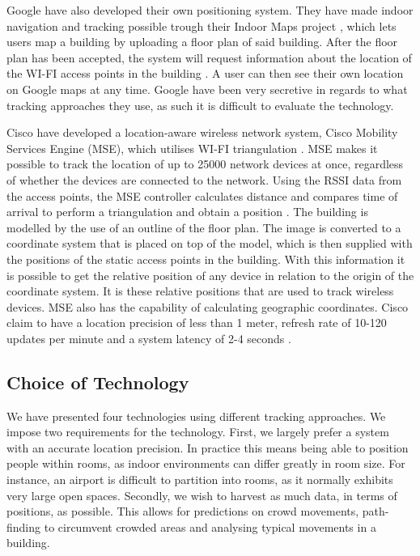 Google have also developed their own positioning system. They have made indoor navigation and tracking possible trough their Indoor Maps project \cite{IPSoverGPS}, which lets users map a building by uploading a floor plan of said building. After the floor plan has been accepted, the system will request information about the location of the WI-FI access points in the building \cite{googleindoormaps}. A user can then see their own location on Google maps at any time. Google have been very secretive in regards to what tracking approaches they use, as such it is difficult to evaluate the technology.

Cisco have developed a location-aware wireless network system, Cisco Mobility Services Engine (MSE), which utilises WI-FI triangulation \cite{CiscoTri}. MSE makes it possible to track the location of up to 25000 network devices at once, regardless of whether the devices are connected to the network. Using the RSSI data from the access points, the MSE controller calculates distance and compares time of arrival to perform a triangulation and obtain a position \cite{ciscoMSE}.
The building is modelled by the use of an outline of the floor plan. The image is converted to a coordinate system that is placed on top of the model, which is then supplied with the positions of the static access points in the building. With this information it is possible to get the relative position of any device in relation to the origin of the coordinate system. It is these relative positions that are used to track wireless devices. MSE also has the capability of calculating geographic coordinates.
Cisco claim to have a location precision of less than 1 meter, refresh rate of 10-120 updates per minute and a system latency of 2-4 seconds \cite{dimensions}. 

\subsection{Choice of Technology}\label{subsec:cisco}
We have presented four technologies using different tracking approaches. We impose two requirements for the technology. First, we largely prefer a system with an accurate location precision. In practice this means being able to position people within rooms, as indoor environments can differ greatly in room size. For instance, an airport is difficult to partition into rooms, as it normally exhibits very large open spaces. Secondly, we wish to harvest as much data, in terms of positions, as possible. This allows for predictions on crowd movements, path-finding to circumvent crowded areas and analysing typical movements in a building. 

